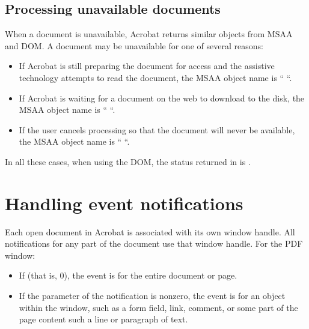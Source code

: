 \documentclass[letterpaper,12pt,english,openany,oneside]{sphinxmanual}
\begin{document}
\subsection{Processing unavailable documents}
\label{\detokenize{index:processing-unavailable-documents}}
When a document is unavailable, Acrobat returns similar objects from MSAA and DOM. A document may be unavailable for one of several reasons:
\begin{itemize}
\item {} 
If Acrobat is still preparing the document for access and the assistive technology attempts to read the document, the MSAA object name is “ “.

\item {} 
If Acrobat is waiting for a document on the web to download to the disk, the MSAA object name is “ “.

\item {} 
If the user cancels processing so that the document will never be available, the MSAA object name is “ “.

\end{itemize}

In all these cases, when using the DOM, the status returned in  is  .




\section{Handling event notifications}
\label{\detokenize{index:handling-event-notifications}}
Each open document in Acrobat is associated with its own window handle. All  notifications for any part of the document use that window handle. For the PDF window:
\begin{itemize}
\item {} 
If  (that is, 0), the event is for the entire document or page.

\item {} 
If the  parameter of the notification is non\sphinxhyphen{}zero, the event is for an object within the window, such as a form field, link, comment, or some part of the page content such a line or paragraph of text.

\end{itemize}
\end{document}
